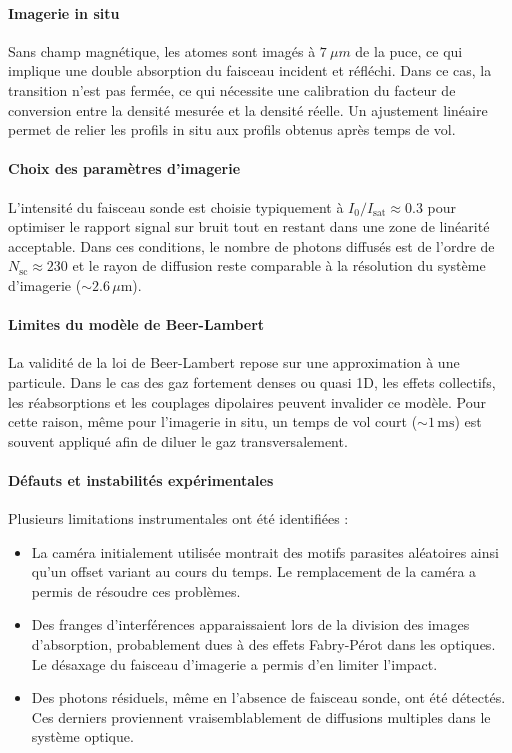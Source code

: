 \paragraph{Imagerie in situ}

Sans champ magnétique, les atomes sont imagés à $7~\mu m$ de la puce, ce qui implique une double absorption du faisceau incident et réfléchi. Dans ce cas, la transition n’est pas fermée, ce qui nécessite une calibration du facteur de conversion entre la densité mesurée et la densité réelle. Un ajustement linéaire permet de relier les profils in situ aux profils obtenus après temps de vol.

\paragraph{Choix des paramètres d’imagerie}

L’intensité du faisceau sonde est choisie typiquement à \( I_0/I_{\mathrm{sat}} \approx 0.3 \) pour optimiser le rapport signal sur bruit tout en restant dans une zone de linéarité acceptable. Dans ces conditions, le nombre de photons diffusés est de l’ordre de \( N_{\mathrm{sc}} \approx 230 \) et le rayon de diffusion reste comparable à la résolution du système d’imagerie (\( \sim 2.6\,\mu \mathrm{m} \)).

\paragraph{Limites du modèle de Beer-Lambert}

La validité de la loi de Beer-Lambert repose sur une approximation à une particule. Dans le cas des gaz fortement denses ou quasi 1D, les effets collectifs, les réabsorptions et les couplages dipolaires peuvent invalider ce modèle. Pour cette raison, même pour l’imagerie in situ, un temps de vol court (\( \sim 1\,\mathrm{ms} \)) est souvent appliqué afin de diluer le gaz transversalement.

\paragraph{Défauts et instabilités expérimentales}

Plusieurs limitations instrumentales ont été identifiées :
\begin{itemize}
    \item La caméra initialement utilisée montrait des motifs parasites aléatoires ainsi qu’un offset variant au cours du temps. Le remplacement de la caméra a permis de résoudre ces problèmes.
    \item Des franges d’interférences apparaissaient lors de la division des images d’absorption, probablement dues à des effets Fabry-Pérot dans les optiques. Le désaxage du faisceau d’imagerie a permis d’en limiter l’impact.
    \item Des photons résiduels, même en l’absence de faisceau sonde, ont été détectés. Ces derniers proviennent vraisemblablement de diffusions multiples dans le système optique.
\end{itemize}

